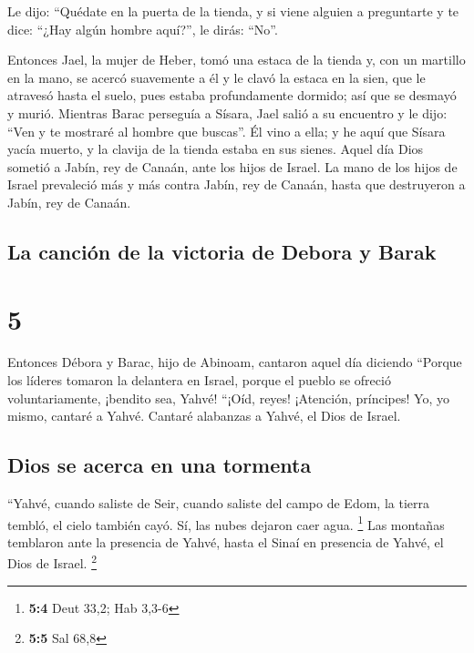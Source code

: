  Le dijo: ``Quédate en la puerta de la tienda, y si viene
alguien a preguntarte y te dice: ``¿Hay algún hombre aquí?'', le dirás:
``No''.

 Entonces Jael, la mujer de Heber, tomó una estaca de la
tienda y, con un martillo en la mano, se acercó suavemente a él y le
clavó la estaca en la sien, que le atravesó hasta el suelo, pues estaba
profundamente dormido; así que se desmayó y murió. 
Mientras Barac perseguía a Sísara, Jael salió a su encuentro y le dijo:
``Ven y te mostraré al hombre que buscas''. Él vino a ella; y he aquí
que Sísara yacía muerto, y la clavija de la tienda estaba en sus sienes.
 Aquel día Dios sometió a Jabín, rey de Canaán, ante los
hijos de Israel.  La mano de los hijos de Israel
prevaleció más y más contra Jabín, rey de Canaán, hasta que destruyeron
a Jabín, rey de Canaán.

\hypertarget{la-canciuxf3n-de-la-victoria-de-debora-y-barak}{%
\subsection{La canción de la victoria de Debora y
Barak}\label{la-canciuxf3n-de-la-victoria-de-debora-y-barak}}

\hypertarget{section-4}{%
\section{5}\label{section-4}}

 Entonces Débora y Barac, hijo de Abinoam, cantaron aquel
día diciendo  ``Porque los líderes tomaron la delantera en
Israel, porque el pueblo se ofreció voluntariamente, ¡bendito sea,
Yahvé!  ``¡Oíd, reyes! ¡Atención, príncipes! Yo, yo mismo,
cantaré a Yahvé. Cantaré alabanzas a Yahvé, el Dios de Israel.

\hypertarget{dios-se-acerca-en-una-tormenta}{%
\subsection{Dios se acerca en una
tormenta}\label{dios-se-acerca-en-una-tormenta}}

 ``Yahvé, cuando saliste de Seir, cuando saliste del campo
de Edom, la tierra tembló, el cielo también cayó. Sí, las nubes dejaron
caer agua. \footnote{\textbf{5:4} Deut 33,2; Hab 3,3-6} 
Las montañas temblaron ante la presencia de Yahvé, hasta el Sinaí en
presencia de Yahvé, el Dios de Israel. \footnote{\textbf{5:5} Sal 68,8}

